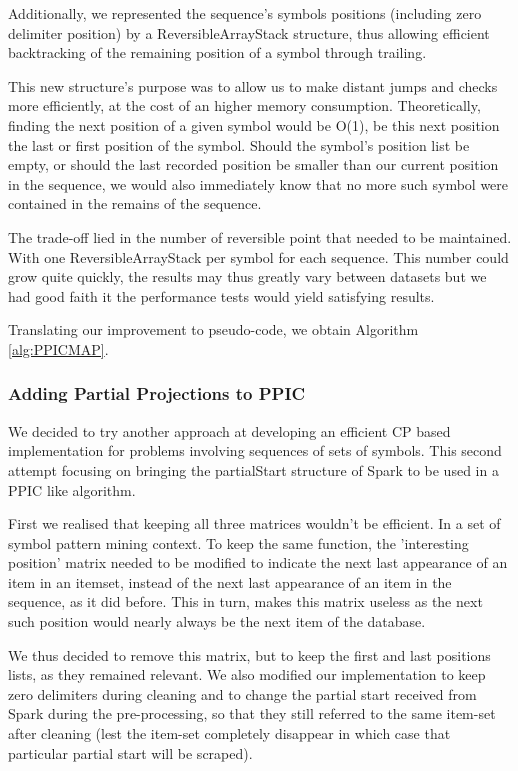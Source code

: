 \documentclass{eplmastersthesis}
\begin{document}
Additionally, we represented the sequence's symbols positions (including zero delimiter position) by a ReversibleArrayStack structure, thus allowing efficient backtracking of the remaining position of a symbol through trailing. \newline

This new structure's purpose was to allow us to make distant jumps and checks more efficiently, at the cost of an higher memory consumption. Theoretically, finding the next position of a given symbol would be O(1), be this next position the last or first position of the symbol. Should the symbol's position list be empty, or should the last recorded position be smaller than our current position in the sequence, we would also immediately know that no more such symbol were contained in the remains of the sequence. \newline

The trade-off lied in the number of reversible point that needed to be maintained. With one ReversibleArrayStack per symbol for each sequence. This number could grow quite quickly, the results may thus greatly vary between datasets but we had good faith it the performance tests would yield satisfying results.

Translating our improvement to pseudo-code, we obtain Algorithm \ref{alg:PPICMAP}.

\subsubsection{Adding Partial Projections to PPIC}

We decided to try another approach at developing an efficient CP based implementation for problems involving sequences of sets of symbols. This second attempt focusing on bringing the partialStart structure of Spark to be used in a PPIC like algorithm. \newline

First we realised that keeping all three matrices wouldn't be efficient. In a set of symbol pattern mining context. To keep the same function, the 'interesting position' matrix needed to be modified to indicate the next last appearance of an item in an itemset, instead of the next last appearance of an item in the sequence, as it did before. This in turn, makes this matrix useless as the next such position would nearly always be the next item of the database. \newline

We thus decided to remove this matrix, but to keep the first and last positions lists, as they remained relevant.
We also modified our implementation to keep zero delimiters during cleaning and to change the partial start received from Spark during the pre-processing, so that they still referred to the same item-set after cleaning (lest the item-set completely disappear in which case that particular partial start will be scraped). \newline
\end{document}
